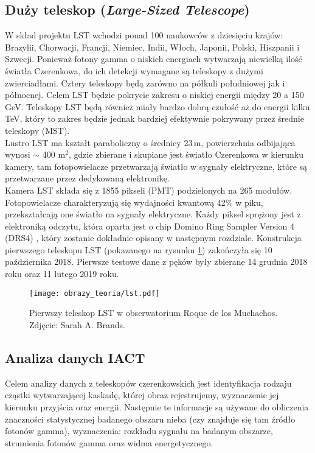 \documentclass[a4paper,11pt,twoside]{article}
\begin{document}
\subsection{Duży teleskop (\textsl{Large-Sized Telescope})}
W skład projektu LST wchodzi ponad 100 naukowców z dziesięciu krajów: Brazylii, Chorwacji, Francji, Niemiec, Indii, Włoch, Japonii, Polski, Hiszpanii i Szwecji. Ponieważ fotony gamma o niskich energiach wytwarzają niewielką ilość światła Czerenkowa, do ich detekcji wymagane są teleskopy z dużymi zwierciadłami. Cztery teleskopy będą zarówno na półkuli południowej jak i północnej. Celem LST będzie pokrycie zakresu o niskiej energii między 20 a 150 GeV. Teleskopy LST będą również miały bardzo dobrą czułość aż do energii kilku TeV, który to zakres będzie jednak bardziej efektywnie pokrywany przez średnie teleskopy (MST). \\
Lustro LST ma kształt paraboliczny o średnicy 23\,m, powierzchnia odbijająca wynosi $\sim$ 400 m$^2$, gdzie zbierane i skupiane jest światło Czerenkowa w kierunku kamery, tam fotopowielacze przetwarzają światło w sygnały elektryczne, które są przetwarzane przez dedykowaną elektronikę. \\
Kamera LST składa się z 1855 pikseli (PMT) podzielonych na 265 modułów. Fotopowielacze charakteryzują się  wydajności kwantową 42\% w piku, przekształcają one światło na sygnały elektryczne. Każdy piksel sprężony jest z elektroniką odczytu, która oparta jest o chip Domino Ring Sampler Version 4 (DRS4) \cite{cta-web-lst}, który zostanie dokładnie opisany w następnym rozdziale. Konstrukcja pierwszego teleskopu LST (pokazanego na rysunku \ref{fig:lst}) zakończyła się 10 października 2018. Pierwsze testowe dane z pęków były zbierane 14 grudnia 2018 roku oraz 11 lutego 2019 roku.
\begin{figure}[H] 
\centering
\texttt{[image: obrazy\_teoria/lst.pdf]}
\caption{Pierwszy teleskop LST w obserwatorium Roque de los Muchachos. Zdjęcie: Sarah A. Brands.}
\label{fig:lst}
\end{figure}
\subsection{Analiza danych IACT}
Celem analizy danych z teleskopów czerenkowskich jest identyfikacja rodzaju cząstki wytwarzającej  kaskadę, której obraz rejestrujemy, wyznaczenie jej kierunku przyjścia oraz energii. Następnie te informacje są używane do obliczenia znaczności statystycznej badanego obszaru nieba (czy znajduje się tam źródło fotonów gamma), wyznaczenia: rozkładu sygnału na badanym obszarze, strumienia fotonów gamma oraz widma energetycznego. 
\end{document}
